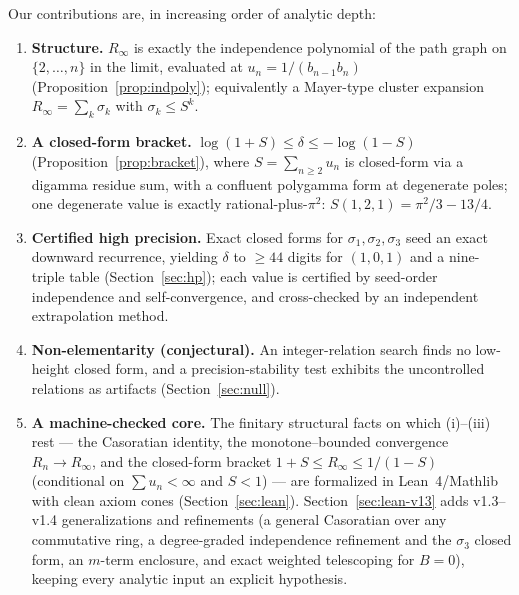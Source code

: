 \documentclass[11pt]{article}
\newcommand{\Rinf}{R_\infty}
\begin{document}
Our contributions are, in increasing order of analytic depth:
\begin{enumerate}
\item[(i)] \textbf{Structure.} $\Rinf$ is exactly the independence polynomial of
the path graph on $\{2,\dots,n\}$ in the limit, evaluated at $u_n=1/(b_{n-1}b_n)$
(Proposition~\ref{prop:indpoly}); equivalently a Mayer-type cluster expansion
$\Rinf=\sum_k\sigma_k$ with $\sigma_k\le S^k$.
\item[(ii)] \textbf{A closed-form bracket.} $\log(1+S)\le\delta\le-\log(1-S)$
(Proposition~\ref{prop:bracket}), where $S=\sum_{n\ge2}u_n$ is closed-form via a
digamma residue sum, with a confluent polygamma form at degenerate poles; one
degenerate value is exactly rational-plus-$\pi^2$: $S(1,2,1)=\pi^2/3-13/4$.
\item[(iii)] \textbf{Certified high precision.} Exact closed forms for
$\sigma_1,\sigma_2,\sigma_3$ seed an exact downward recurrence, yielding $\delta$ to
$\ge44$ digits for $(1,0,1)$ and a nine-triple table (Section~\ref{sec:hp}); each
value is certified by seed-order independence and self-convergence, and
cross-checked by an independent extrapolation method.
\item[(iv)] \textbf{Non-elementarity (conjectural).} An integer-relation search
finds no low-height closed form, and a precision-stability test exhibits the
uncontrolled relations as artifacts (Section~\ref{sec:null}).
\item[(v)] \textbf{A machine-checked core.} The finitary structural facts on which
(i)--(iii) rest --- the Casoratian identity, the monotone--bounded convergence
$R_n\to\Rinf$, and the closed-form bracket $1+S\le\Rinf\le1/(1-S)$ (conditional on
$\sum u_n<\infty$ and $S<1$) --- are formalized in Lean~4/Mathlib with clean axiom
cones (Section~\ref{sec:lean}). Section~\ref{sec:lean-v13} adds v1.3--v1.4 generalizations
and refinements (a general Casoratian over any commutative ring, a degree-graded
independence refinement and the $\sigma_3$ closed form, an $m$-term enclosure, and
exact weighted telescoping for
$B=0$), keeping every analytic input an explicit hypothesis.
\end{enumerate}
\end{document}
